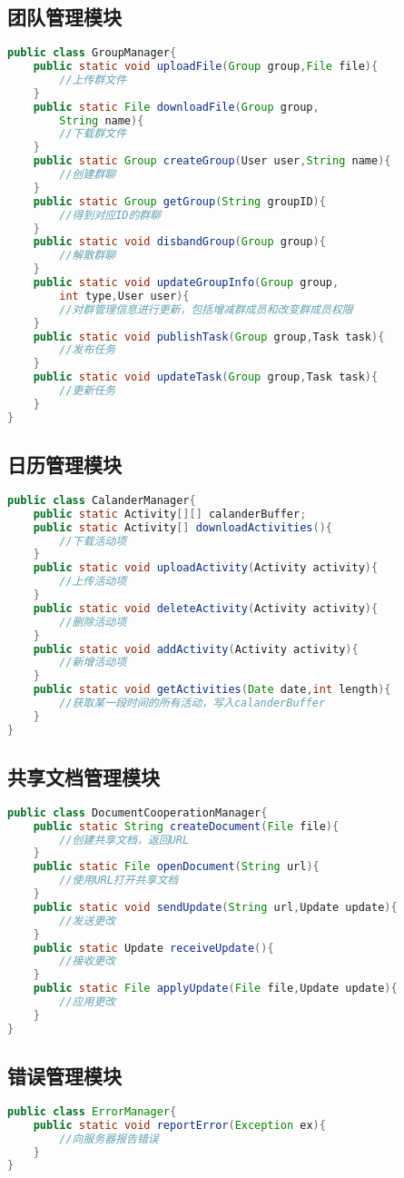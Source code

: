 \subsection{团队管理模块}
\begin{lstlisting}[language=Java, caption=团队管理模块接口]
public class GroupManager{
    public static void uploadFile(Group group,File file){
        //上传群文件
    }
    public static File downloadFile(Group group,
        String name){
        //下载群文件
    }
    public static Group createGroup(User user,String name){
        //创建群聊
    }
    public static Group getGroup(String groupID){
        //得到对应ID的群聊
    }
    public static void disbandGroup(Group group){
        //解散群聊
    }
    public static void updateGroupInfo(Group group,
        int type,User user){
        //对群管理信息进行更新，包括增减群成员和改变群成员权限
    }
    public static void publishTask(Group group,Task task){
        //发布任务
    }
    public static void updateTask(Group group,Task task){
        //更新任务
    }
}
\end{lstlisting}

\subsection{日历管理模块}
\begin{lstlisting}[language=Java, caption=日历管理模块接口]
public class CalanderManager{
    public static Activity[][] calanderBuffer;
    public static Activity[] downloadActivities(){
        //下载活动项
    }
    public static void uploadActivity(Activity activity){
        //上传活动项
    }
    public static void deleteActivity(Activity activity){
        //删除活动项
    }
    public static void addActivity(Activity activity){
        //新增活动项
    }
    public static void getActivities(Date date,int length){
        //获取某一段时间的所有活动，写入calanderBuffer
    }
}
\end{lstlisting}

\subsection{共享文档管理模块}
\begin{lstlisting}[language=Java, caption=共享文档管理模块接口]
public class DocumentCooperationManager{
    public static String createDocument(File file){
        //创建共享文档，返回URL
    }
    public static File openDocument(String url){
        //使用URL打开共享文档
    }
    public static void sendUpdate(String url,Update update){
        //发送更改
    }
    public static Update receiveUpdate(){
        //接收更改
    }
    public static File applyUpdate(File file,Update update){
        //应用更改
    }
}
\end{lstlisting}

\subsection{错误管理模块}
\begin{lstlisting}[language=Java, caption=错误管理模块接口]
public class ErrorManager{
    public static void reportError(Exception ex){
        //向服务器报告错误
    }
}
\end{lstlisting}